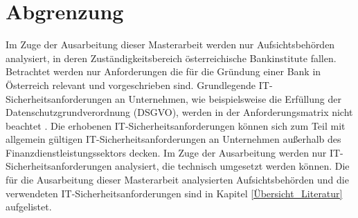 \section{Abgrenzung}
\label{cha:abgrenzung}
Im Zuge der Ausarbeitung dieser Masterarbeit werden nur Aufsichtsbehörden analysiert, in deren Zuständigkeitsbereich österreichische Bankinstitute fallen. Betrachtet werden nur Anforderungen die für die Gründung einer Bank in Österreich relevant und vorgeschrieben sind. Grundlegende IT-Sicherheitsanforderungen an Unternehmen, wie beispielsweise die Erfüllung der Datenschutzgrundverordnung (DSGVO), werden in der Anforderungsmatrix nicht beachtet \autocite{datenschutzbehörde}. Die erhobenen IT-Sicherheitsanforderungen können sich zum Teil mit allgemein gültigen IT-Sicherheitsanforderungen an Unternehmen außerhalb des Finanzdienstleistungssektors decken. Im Zuge der Ausarbeitung werden nur IT-Sicherheitsanforderungen analysiert, die technisch umgesetzt werden können. Die für die Ausarbeitung dieser Masterarbeit analysierten Aufsichtsbehörden und die verwendeten IT-Sicherheitsanforderungen sind in Kapitel \ref{Übersicht_Literatur} aufgelistet. 